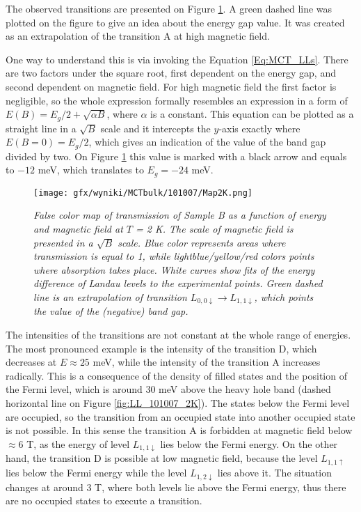 \documentclass[titlepage,a4paper]{book}
\begin{document}
The observed transitions are presented on Figure \ref{fig:Map_101007_2K}. A green dashed line was plotted on the figure to give an idea about the energy gap value. It was created as an extrapolation of the transition A at high magnetic field. 

One way to understand this is via invoking the Equation \ref{Eq:MCT_LLs}. There are two factors under the square root, first dependent on the energy gap, and second dependent on magnetic field. For high magnetic field the first factor is negligible, so the whole expression formally resembles an expression in a form of $E(B) = E_g/2 + \sqrt{\alpha B} $, where $\alpha$ is a constant. This equation can be plotted as a straight line in a $\sqrt{B}$ scale and it intercepts the $y$-axis exactly where $E(B = 0) = E_g/2$, which gives an indication of the value of the band gap divided by two. On Figure \ref{fig:Map_101007_2K} this value is marked with a black arrow and equals to $-12$ meV, which translates to $E_g = -24$ meV.
\begin{figure}[ht]
	\centering
	\texttt{[image: gfx/wyniki/MCTbulk/101007/Map2K.png]}
	\vspace{-10pt}
	\caption{\textit{False color map of transmission of Sample B as a function of energy and magnetic field at $T$ = 2 K. The scale of magnetic field is presented in a $\sqrt{B}$ scale. Blue color represents areas where transmission is equal to 1, while lightblue/yellow/red colors points where absorption takes place. White curves show fits of the energy difference of Landau levels to the experimental points. Green dashed line is an extrapolation of transition $L_{0,0\downarrow}\rightarrow L_{1,1\downarrow}$, which points the value of the (negative) band gap.}}
	\label{fig:Map_101007_2K}
\end{figure} 

The intensities of the transitions are not constant at the whole range of energies. The most pronounced example is the intensity of the transition D, which decreases at $E \approx 25$ meV, while the intensity of the transition A increases radically. This is a consequence of the density of filled states and the position of the Fermi level, which is around 30 meV above the heavy hole band (dashed horizontal line on Figure \ref{fig:LL_101007_2K}). The states below the Fermi level are occupied, so the transition from an occupied state into another occupied state is not possible. In this sense the transition A is forbidden at magnetic field below $\approx 6$ T, as the energy of level $L_{1,1\downarrow}$ lies below the Fermi energy. On the other hand, the transition D is possible at low magnetic field, because the level $L_{1,1\uparrow}$ lies below the Fermi energy while the level $L_{1,2\downarrow}$ lies above it. The situation changes at around 3 T, where both levels lie above the Fermi energy, thus there are no occupied states to execute a transition.
\end{document}
